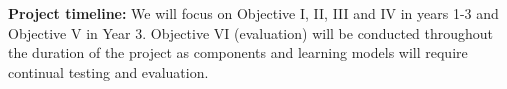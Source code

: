 





\vspace{2mm} \noindent \textbf{Project timeline: }We will focus on Objective I, II, III and IV in years 1-3 and Objective V in Year 3. Objective VI (evaluation) will be conducted throughout the duration of the project as components and learning models will require continual testing and evaluation. %